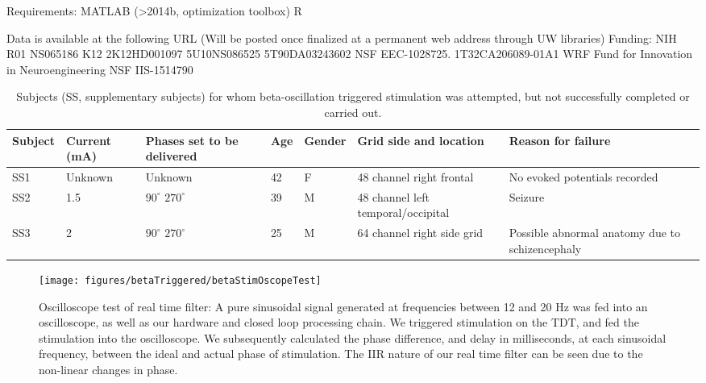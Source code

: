 Requirements: 
MATLAB (>2014b, optimization toolbox) 
R

Data is available at the following URL
(Will be posted once finalized at a permanent web address through UW libraries)
Funding:
NIH R01 NS065186
K12 2K12HD001097
5U10NS086525
5T90DA03243602
NSF EEC-1028725.
1T32CA206089-01A1 
WRF Fund for Innovation in Neuroengineering
NSF IIS-1514790

\renewcommand{\tabcolsep}{1pt}
\renewcommand{\arraystretch}{0.7}
\begin{table}[ht]
	\scriptsize
	\begin{tabularx}{\textwidth}{@{}lllllXX@{}}
		\toprule
		Subject & Current (mA) & Phases set to be delivered & Age & Gender & Grid side and location & Reason for failure \\
		\midrule
SS1 & Unknown & Unknown & 42 & F & 48 channel right frontal & No evoked potentials recorded \\
SS2 & 1.5 &	$90^{\circ}$ \newline $270^{\circ}$ & 39 & M & 48  channel left temporal/occipital & Seizure \\
SS3 & 2 &	$90^{\circ}$ \newline $270^{\circ}$ & 25 & M & 64 channel right side grid & Possible abnormal anatomy due to schizencephaly \\
		\bottomrule		
	\end{tabularx}
	\caption[Supplemental Subject Demographics]{Subjects (SS, supplementary subjects) for whom beta-oscillation triggered stimulation was attempted, but not successfully completed or carried out.}
	\label{table:betaStimSubjSuppl}
\end{table}


\begin{figure}[ht]
	\centering
	\texttt{[image: figures/betaTriggered/betaStimOscopeTest]}
	\caption[Example one layer fit]{Oscilloscope test of real time filter: A pure sinusoidal signal generated at frequencies between 12 and 20 Hz was fed into an oscilloscope, as well as our hardware and closed loop processing chain. We triggered stimulation on the TDT, and fed the stimulation into the oscilloscope. We subsequently calculated the phase difference, and delay in milliseconds, at each sinusoidal frequency, between the ideal and actual phase of stimulation. The IIR nature of our real time filter can be seen due to the non-linear changes in phase.  
	}
	\label{fig:betaStimOscopeTest}
\end{figure}

